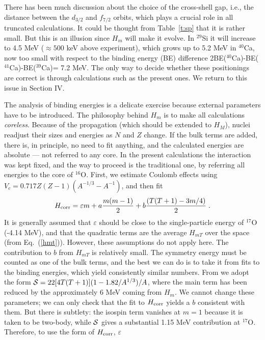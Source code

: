 \begin{multicols}{2}
There has been much discussion about the choice of the cross-shell
gap, i.e., the distance between the $d_{3/2}$ and $f_{7/2}$ orbits,
which plays a crucial role in all truncated calculations. It could be
thought from Table~\ref{t:sp} that it is rather small. But this is an
illusion since $H_m$ will make it evolve. In $^{29}$Si it will
increase to 4.5 MeV ($\approx 500$ keV above experiment), which grows
up to 5.2 MeV in $^{40}$Ca, now too small with respect to the binding
energy (BE) difference 2BE($^{40}$Ca)-BE($^{41}$Ca)-BE($^{39}$Ca)= 7.2
MeV.  The only way to decide whether these positionings are correct is
through calculations such as the present ones. We return to this issue
in Section IV.

The analysis of binding energies is a delicate exercise because
external parameters have to be introduced. The philosophy behind $H_m$
is to make all calculations {\em coreless}.  Because of the \hw
propagation (which should be extended to $H_M$), nuclei readjust their
sizes and energies as $N$ and $Z$ change. If the bulk terms are added,
there is, in principle, no need to fit anything, and the calculated
energies are absolute --- not referred to any core. In the present
calculations the interaction was kept fixed, and the way to proceed is
the traditional one, by referring all energies to the core of $^{16}$O.
First, we estimate Coulomb effects using $V_c=0.717
Z(Z-1)(A^{-1/3}-A^{-1})$, and then fit
\begin{equation}
H_{\rm corr}=\varepsilon m + a\frac{m(m-1)}{2} + b\frac{(T(T+1)-3m/4)}{2}\;.
\end{equation}
It is generally assumed that $\varepsilon$ should be close to the
single-particle energy of $^{17}$O (-4.14 MeV), and that the
quadratic terms are the average $H_{mT}$ over the space (from
Eq.~(\ref{hmt})). However, these assumptions do not apply here. The
contribution to $b$ from $H_{mT}$ is relatively small. The symmetry
energy must be counted as one of the bulk terms, and the best we can
do is to take it from fits to the binding energies, which yield
consistently similar numbers. From \cite{jdz95} we adopt the form
\mbox{${\cal S}=22[4T(T+1)](1-1.82/A^{1/3})/A$}, where the main term
has been reduced by the approximately 6 MeV coming from $H_m$. We
cannot change these parameters; we can only check that the
fit to $H_{\rm corr}$ yields a $b$
consistent with them. But there is subtlety: the
isospin term vanishes at $m=1$ because it is taken to be two-body,
while ${\cal S}$ gives a substantial 1.15 MeV contribution at
$^{17}$O.  Therefore, to use the form of $H_{\rm corr}$, $\varepsilon$

\end{multicols}
